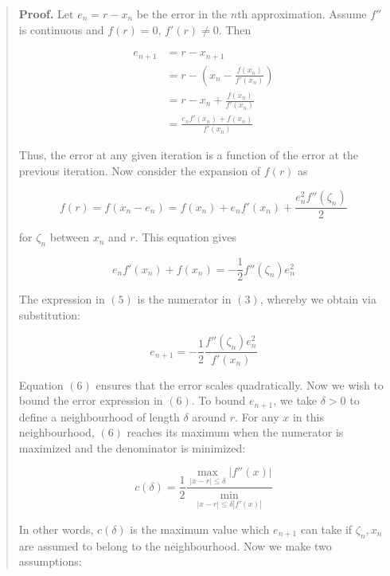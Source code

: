 \documentclass[12pt]{article}
\theoremstyle{definition}
\begin{document}
\small
\begin{quote}

\textbf{Proof.} Let $e_n = r - x_n$ be the error in the $n$th approximation. Assume $f''$ is
continuous and $f(r) = 0$, $f'(r) \neq 0$. Then 

\begin{align}
    e_{n+1} &= r-  x_{n+1}  \nonumber \\ 
&= r - \left( x_n - \frac{f(x_n)}{f'(x_n)} \right) \nonumber \\ 
&= r - x_n  + \frac{f(x_n)}{f'(x_n)}\nonumber \\
&=\frac{e_n f'(x_n) + f(x_n)}{f'(x_n)}
\end{align}

Thus, the error at any given iteration is a function of the error at the
previous iteration. Now consider the expansion of $f(r)$ as 

\begin{equation}
    f(r) = f(x_n - e_n) = f(x_n) + e_nf'(x_n) + \frac{e_n^2f''(\zeta_n)}{2}
\end{equation}

for $\zeta_n$ between $x_n$ and $r$. This equation gives 

\begin{equation}
    e_n f'(x_n) + f(x_n) = -\frac{1}{2} f''(\zeta_n)e_n^2
\end{equation}

The expression in $(5)$ is the numerator in $(3)$, whereby we obtain via
substitution: 

\begin{equation}
    e_{n+1} =  -\frac{1}{2}\frac{f''(\zeta_n)e^2_n}{f'(x_n)} 
\end{equation}

Equation $(6)$ ensures that the error scales quadratically. Now we wish to
bound the error expression in $(6)$. To bound $e_{n+1}$, we take
$\delta > 0$ to define a neighbourhood of length $\delta$ around $r$. For any
$x$ in this neighbourhood, $(6)$ reaches its maximum when the numerator is
maximized and the denominator is minimized:

\begin{equation*}
    c(\delta) = \frac{1}{2} \frac{ \max_{\left| x - r \right| \leq \delta }
    \left| f''(x) \right|  }{\min_{\left| x-r \right| \leq \delta \left| f'(x) \right|  }}
\end{equation*}

In other words, $c(\delta)$ is the maximum value which $e_{n+1}$ can take if
$\zeta_n, x_n$ are assumed to belong to the neighbourhood. Now we make two
assumptions: 


\end{quote}
\end{document}

